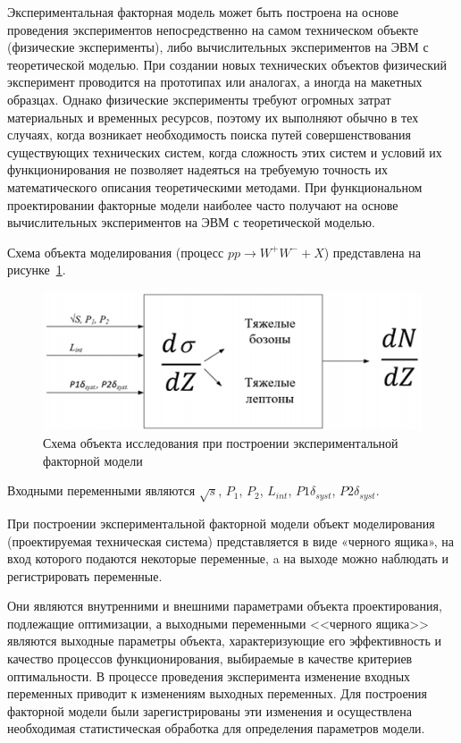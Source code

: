 Экспериментальная факторная модель может быть построена на основе
проведения экспериментов непосредственно на самом техническом объекте
(физические эксперименты), либо вычислительных экспериментов на ЭВМ с
теоретической моделью. При создании новых технических объектов физический
эксперимент проводится на прототипах или аналогах, а иногда на макетных
образцах. Однако физические эксперименты требуют огромных затрат
материальных и временных ресурсов, поэтому их выполняют обычно в тех
случаях, когда возникает необходимость поиска путей совершенствования
существующих технических систем, когда сложность этих систем и условий их
функционирования не позволяет надеяться на требуемую точность их
математического описания теоретическими методами. При функциональном
проектировании факторные модели наиболее часто получают на основе
вычислительных экспериментов на ЭВМ с теоретической моделью. 

Схема объекта
моделирования (процесс $pp \rightarrow W^+W^- + X$) представлена на рисунке~\ref{fig:schema-model}.

\begin{figure}[!h]
	\centering
	\includegraphics[width=\textwidth]{figures/imitation-schema.png}
	\caption{Схема объекта исследования при построении экспериментальной
		факторной модели}
	\label{fig:schema-model}
\end{figure}

Входными переменными являются $\sqrt{s}$, ${P}_{1}$, ${P}_{2}$, ${L}_{int}$, $P\textit{1}{\delta}_{syst}$, $P\textit{2}{\delta}_{syst}$. 

При построении экспериментальной факторной модели объект
моделирования (проектируемая техническая система) представляется в виде
«черного ящика», на вход которого подаются некоторые переменные, a на
выходе можно наблюдать и регистрировать переменные. 

Они являются внутренними и внешними параметрами объекта проектирования,
подлежащие оптимизации, а выходными переменными <<черного ящика>>
являются выходные параметры объекта, характеризующие его эффективность и
качество процессов функционирования, выбираемые в качестве критериев
оптимальности. В процессе проведения эксперимента изменение входных
переменных приводит к изменениям выходных переменных. Для построения
факторной модели были зарегистрированы эти изменения и осуществлена
необходимая статистическая обработка для определения параметров модели.